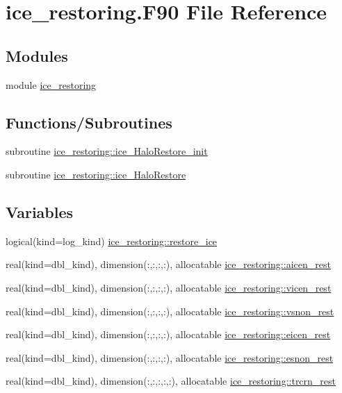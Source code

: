 \hypertarget{ice__restoring_8F90}{
\section{ice\_\-restoring.F90 File Reference}
\label{ice__restoring_8F90}
}
\subsection*{Modules}
\begin{DoxyCompactItemize}
\item 
module \hyperlink{namespaceice__restoring}{ice\_\-restoring}
\end{DoxyCompactItemize}
\subsection*{Functions/Subroutines}
\begin{DoxyCompactItemize}
\item 
subroutine \hyperlink{namespaceice__restoring_a5abeabb1c3d2382c18bedd81914b9b60}{ice\_\-restoring::ice\_\-HaloRestore\_\-init}
\item 
subroutine \hyperlink{namespaceice__restoring_a49df88e98add45cf36562220985fea56}{ice\_\-restoring::ice\_\-HaloRestore}
\end{DoxyCompactItemize}
\subsection*{Variables}
\begin{DoxyCompactItemize}
\item 
logical(kind=log\_\-kind) \hyperlink{namespaceice__restoring_a4c1ab4e7a35fa0a753fd36909805bfc9}{ice\_\-restoring::restore\_\-ice}
\item 
real(kind=dbl\_\-kind), dimension(:,:,:,:), allocatable \hyperlink{namespaceice__restoring_a1e0ef4f98814f59a3331155876b9a23f}{ice\_\-restoring::aicen\_\-rest}
\item 
real(kind=dbl\_\-kind), dimension(:,:,:,:), allocatable \hyperlink{namespaceice__restoring_a4ebbb2fde1fd6d9cd8b5e5b9d3d87282}{ice\_\-restoring::vicen\_\-rest}
\item 
real(kind=dbl\_\-kind), dimension(:,:,:,:), allocatable \hyperlink{namespaceice__restoring_a631c5dd66d9dbbad28240813763f7acf}{ice\_\-restoring::vsnon\_\-rest}
\item 
real(kind=dbl\_\-kind), dimension(:,:,:,:), allocatable \hyperlink{namespaceice__restoring_a355c3e0f0ff976375ef772137ca2fb89}{ice\_\-restoring::eicen\_\-rest}
\item 
real(kind=dbl\_\-kind), dimension(:,:,:,:), allocatable \hyperlink{namespaceice__restoring_a58f323dca24452c0602f2010b2bdec76}{ice\_\-restoring::esnon\_\-rest}
\item 
real(kind=dbl\_\-kind), dimension(:,:,:,:,:), allocatable \hyperlink{namespaceice__restoring_a4d5ba93af3c3dfb0760f609dc7ed6692}{ice\_\-restoring::trcrn\_\-rest}
\end{DoxyCompactItemize}
